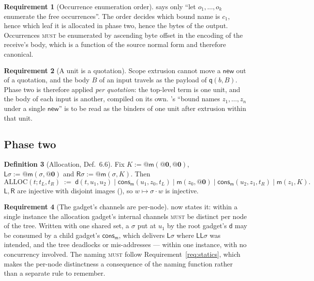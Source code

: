 \documentclass[11pt,a4paper]{article}
\makeatletter
\newcommand{\MUST}{\textsc{must}}
\newcommand{\quo}[1]{@#1}
\newcommand{\nil}{\mathbf{0}}
\newcommand{\mm}{\mathsf{m}}
\newcommand{\dd}{\mathsf{d}}
\newcommand{\qq}{\mathsf{q}}
\newcommand{\cons}{\mathsf{cons}}
\newcommand{\Lft}{\mathsf{L}}
\newcommand{\Rgt}{\mathsf{R}}
\newcommand{\ALLOC}{\mathrm{ALLOC}}
\theoremstyle{definition}
\newtheorem{definition}{Definition}[section]
\newtheorem{requirement}[definition]{Requirement}
\theoremstyle{plain}
\makeatother
\begin{document}
\begin{requirement}[Occurrence enumeration order]\label{req:occorder}
\cite[Def.~6.3]{draft3} says only ``let $o_{1},\dots,o_{k}$ enumerate the free
occurrences''. The order decides which bound name is $c_{1}$, hence which leaf
it is allocated in phase two, hence the bytes of the output. Occurrences
\MUST{} be enumerated by ascending byte offset in the encoding of the
receive's body, which is a function of the source normal form and therefore
canonical.
\end{requirement}

\begin{requirement}[A unit is a quotation]\label{req:units}
Scope extrusion cannot move a $\mathsf{new}$ out of a quotation, and the body
$B$ of an input travels as the payload of $\qq(b,B)$. Phase two is therefore
applied \emph{per quotation}: the top-level term is one unit, and the body of
each input is another, compiled on its own. \cite[Def.~6.8]{draft3}'s ``bound
names $z_{1},\dots,z_{n}$ under a single $\mathsf{new}$'' is to be read as the
binders of one unit after extrusion within that unit.
\end{requirement}

\subsection{Phase two}\label{sec:phase2}

\begin{definition}[Allocation, \cite{draft3} Def.~6.6]\label{def:alloc}
Fix $K := \quo{\mm(\quo{\nil},\quo{\nil})}$,
$\Lft\sigma := \quo{\mm(\sigma,\quo{\nil})}$ and
$\Rgt\sigma := \quo{\mm(\sigma,K)}$. Then
\[
  \ALLOC(t;t_{L},t_{R}) \;:=\;
  \dd(t,u_{1},u_{2}) \mid \cons_{\mm}(u_{1},z_{0},t_{L}) \mid
  \mm(z_{0},\quo{\nil}) \mid \cons_{\mm}(u_{2},z_{1},t_{R}) \mid \mm(z_{1},K).
\]
$\Lft,\Rgt$ are injective with disjoint images
(\cite[Lem.~6.7]{draft3}), so $w \mapsto \sigma\!\cdot\!w$ is injective.
\end{definition}

\begin{requirement}[The gadget's channels are per-node]\label{req:pergadget}
\cite[Rem.~6.13]{draft3} now states it: within a single instance the
allocation gadget's internal channels \MUST{} be distinct per node of the
tree. Written with one shared set, a $\sigma$ put at $u_{1}$ by the root
gadget's $\dd$ may be consumed by a child gadget's $\cons_{\mm}$, which
delivers $\Lft\sigma$ where $\Lft\Lft\sigma$ was intended, and the tree
deadlocks or mis-addresses --- within one instance, with no concurrency
involved. The naming \MUST{} follow Requirement~\ref{req:statics}, which makes
the per-node distinctness a consequence of the naming function rather than a
separate rule to remember.
\end{requirement}
\end{document}
